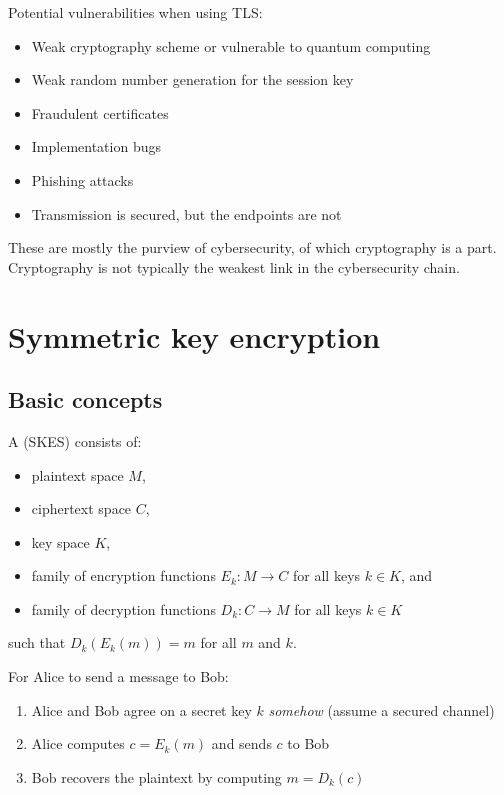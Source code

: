 \documentclass[class=co487,tikz,minted,notes]{agony}
\begin{document}
Potential vulnerabilities when using TLS:
\begin{itemize}[noitemsep]
  \item Weak cryptography scheme or vulnerable to quantum computing
  \item Weak random number generation for the session key
  \item Fraudulent certificates
  \item Implementation bugs
  \item Phishing attacks
  \item Transmission is secured, but the endpoints are not
\end{itemize}
These are mostly the purview of cybersecurity,
of which cryptography is a part.
Cryptography is not typically the weakest link in the cybersecurity chain.

\chapter{Symmetric key encryption}

\section{Basic concepts}

\begin{defn}
  A  (SKES) consists of:
  \begin{itemize}[nosep]
    \item plaintext space $M$,
    \item ciphertext space $C$,
    \item key space $K$,
    \item family of encryption functions $E_k : M \to C$ for all keys $k \in K$, and
    \item family of decryption functions $D_k : C \to M$ for all keys $k \in K$
  \end{itemize}
  such that $D_k(E_k(m)) = m$ for all $m$ and $k$.
\end{defn}

For Alice to send a message to Bob:
\begin{enumerate}[1.,nosep]
  \item Alice and Bob agree on a secret key $k$ \emph{somehow} (assume a secured channel)
  \item Alice computes $c = E_k(m)$ and sends $c$ to Bob
  \item Bob recovers the plaintext by computing $m = D_k(c)$
\end{enumerate}
\end{document}

